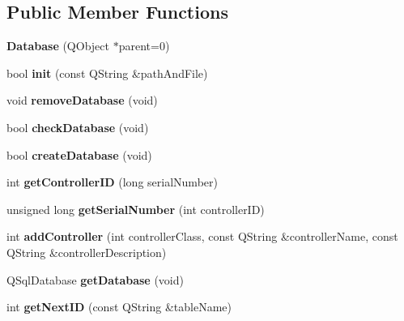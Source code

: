\subsection*{Public Member Functions}
\begin{DoxyCompactItemize}
\item 
\mbox{\label{class_database_a1eb00cb7d192abcfa766f6228492ff23}} 
{\bfseries Database} (Q\+Object $\ast$parent=0)
\item 
\mbox{\label{class_database_aa2c92e707d102550af16c8dca42815ac}} 
bool {\bfseries init} (const Q\+String \&path\+And\+File)
\item 
\mbox{\label{class_database_a53105764e2c9c0992e0e95022046288f}} 
void {\bfseries remove\+Database} (void)
\item 
\mbox{\label{class_database_aff7b80a2cf6743c0a57f63d9bfed641b}} 
bool {\bfseries check\+Database} (void)
\item 
\mbox{\label{class_database_ab916411c9403523dd709de378026754d}} 
bool {\bfseries create\+Database} (void)
\item 
\mbox{\label{class_database_a4eaffbc1571e91a8adb40cfe076069c5}} 
int {\bfseries get\+Controller\+ID} (long serial\+Number)
\item 
\mbox{\label{class_database_a49c87a6a938b5b0027cb3d7e95a2fdd8}} 
unsigned long {\bfseries get\+Serial\+Number} (int controller\+ID)
\item 
\mbox{\label{class_database_aebd4c272f7a8331f46c57105aae3cf31}} 
int {\bfseries add\+Controller} (int controller\+Class, const Q\+String \&controller\+Name, const Q\+String \&controller\+Description)
\item 
\mbox{\label{class_database_a2ac23a6e6b78f19ca0499c2aad2800cc}} 
Q\+Sql\+Database {\bfseries get\+Database} (void)
\item 
\mbox{\label{class_database_a1c19214e960ef7e6e06cf8bc8a96dd13}} 
int {\bfseries get\+Next\+ID} (const Q\+String \&table\+Name)

\end{DoxyCompactItemize}

